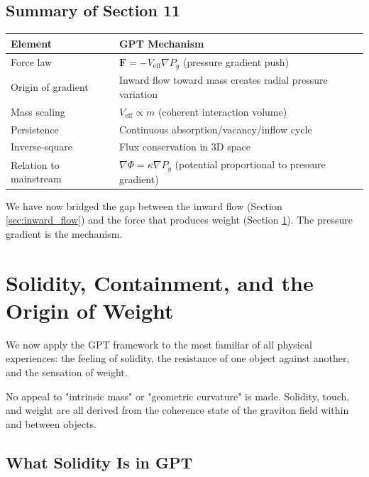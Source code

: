 \documentclass[12pt, a4paper]{article}
\begin{document}
\subsection{Summary of Section 11}
\label{subsec:summary_11}

\begin{center}
\begin{tabular}{|p{3.5cm}|p{10cm}|}
\hline
\textbf{Element} & \textbf{GPT Mechanism} \\
\hline
Force law & \( \mathbf{F} = -V_{\text{eff}} \nabla P_g \) (pressure gradient push) \\
\hline
Origin of gradient & Inward flow toward mass creates radial pressure variation \\
\hline
Mass scaling & \( V_{\text{eff}} \propto m \) (coherent interaction volume) \\
\hline
Persistence & Continuous absorption/vacancy/inflow cycle \\
\hline
Inverse-square & Flux conservation in 3D space \\
\hline
Relation to mainstream & \( \nabla \Phi = \kappa \nabla P_g \) (potential proportional to pressure gradient) \\
\hline
\end{tabular}
\end{center}

We have now bridged the gap between the inward flow (Section \ref{sec:inward_flow}) and the force that produces weight (Section \ref{sec:solidity_weight}). The pressure gradient is the mechanism.

\section{Solidity, Containment, and the Origin of Weight}
\label{sec:solidity_weight}

We now apply the GPT framework to the most familiar of all physical experiences: the feeling of solidity, the resistance of one object against another, and the sensation of weight.

No appeal to "intrinsic mass" or "geometric curvature" is made. Solidity, touch, and weight are all derived from the coherence state of the graviton field within and between objects.

\subsection{What Solidity Is in GPT}
\label{subsec:solidity}
\end{document}

